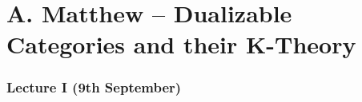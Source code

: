 \part*{A. Matthew -- Dualizable Categories and their K-Theory}
\section{Lecture I (9th September)}\label{sec: Matthew I}
